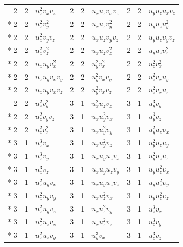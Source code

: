 \documentclass[10pt,a4paper]{article}
\makeatletter
\def\grouprule#1#2{\noalign{\marks\LTgroupmarks{\the\belowrulesep}\nobreak\vskip#1%
  \vskip\aboverulesep}\multispan\LT@cols\unskip{\leaders\hrule\@height#2\hfill\kern\z@}\cr
  \noalign{\penalty\LTrulebreak\vskip\belowrulesep\global\@lastruleclass\z@}}
\numberwithin{equation}{section}
\makeatother
\begin{document}
{\begin{longtable}{@{}rrl@{\hspace{18pt}}rrl@{\hspace{18pt}}rrl@{}}
2 & 2 & $u_{x}^{2}v_{x}v_{z}$ & 2 & 2 & $u_{x}u_{z}v_{x}v_{z}$ & 2 & 2 & $u_{y}u_{z}v_{x}v_{z}$\\*
2 & 2 & $u_{x}^{2}v_{y}^{2}$ & 2 & 2 & $u_{x}u_{z}v_{y}^{2}$ & 2 & 2 & $u_{y}u_{z}v_{y}^{2}$\\*
2 & 2 & $u_{x}^{2}v_{y}v_{z}$ & 2 & 2 & $u_{x}u_{z}v_{y}v_{z}$ & 2 & 2 & $u_{y}u_{z}v_{y}v_{z}$\\*
2 & 2 & $u_{x}^{2}v_{z}^{2}$ & 2 & 2 & $u_{x}u_{z}v_{z}^{2}$ & 2 & 2 & $u_{y}u_{z}v_{z}^{2}$\\*
2 & 2 & $u_{x}u_{y}v_{x}^{2}$ & 2 & 2 & $u_{y}^{2}v_{x}^{2}$ & 2 & 2 & $u_{z}^{2}v_{x}^{2}$\\*
2 & 2 & $u_{x}u_{y}v_{x}v_{y}$ & 2 & 2 & $u_{y}^{2}v_{x}v_{y}$ & 2 & 2 & $u_{z}^{2}v_{x}v_{y}$\\*
2 & 2 & $u_{x}u_{y}v_{x}v_{z}$ & 2 & 2 & $u_{y}^{2}v_{x}v_{z}$ & 2 & 2 & $u_{z}^{2}v_{x}v_{z}$\\
\grouprule{0pt}{\heavyrulewidth}
2 & 2 & $u_{z}^{2}v_{y}^{2}$ & 3 & 1 & $u_{x}^{2}u_{z}v_{z}$ & 3 & 1 & $u_{y}^{3}v_{y}$\\*
2 & 2 & $u_{z}^{2}v_{y}v_{z}$ & 3 & 1 & $u_{x}u_{y}^{2}v_{x}$ & 3 & 1 & $u_{y}^{3}v_{z}$\\*
2 & 2 & $u_{z}^{2}v_{z}^{2}$ & 3 & 1 & $u_{x}u_{y}^{2}v_{y}$ & 3 & 1 & $u_{y}^{2}u_{z}v_{x}$\\*
3 & 1 & $u_{x}^{3}v_{x}$ & 3 & 1 & $u_{x}u_{y}^{2}v_{z}$ & 3 & 1 & $u_{y}^{2}u_{z}v_{y}$\\*
3 & 1 & $u_{x}^{3}v_{y}$ & 3 & 1 & $u_{x}u_{y}u_{z}v_{x}$ & 3 & 1 & $u_{y}^{2}u_{z}v_{z}$\\*
3 & 1 & $u_{x}^{3}v_{z}$ & 3 & 1 & $u_{x}u_{y}u_{z}v_{y}$ & 3 & 1 & $u_{y}u_{z}^{2}v_{x}$\\*
3 & 1 & $u_{x}^{2}u_{y}v_{x}$ & 3 & 1 & $u_{x}u_{y}u_{z}v_{z}$ & 3 & 1 & $u_{y}u_{z}^{2}v_{y}$\\*
3 & 1 & $u_{x}^{2}u_{y}v_{y}$ & 3 & 1 & $u_{x}u_{z}^{2}v_{x}$ & 3 & 1 & $u_{y}u_{z}^{2}v_{z}$\\*
3 & 1 & $u_{x}^{2}u_{y}v_{z}$ & 3 & 1 & $u_{x}u_{z}^{2}v_{y}$ & 3 & 1 & $u_{z}^{3}v_{x}$\\*
3 & 1 & $u_{x}^{2}u_{z}v_{x}$ & 3 & 1 & $u_{x}u_{z}^{2}v_{z}$ & 3 & 1 & $u_{z}^{3}v_{y}$\\*
3 & 1 & $u_{x}^{2}u_{z}v_{y}$ & 3 & 1 & $u_{y}^{3}v_{x}$ & 3 & 1 & $u_{z}^{3}v_{z}$\\
\bottomrule\end{longtable}}
\end{document}

